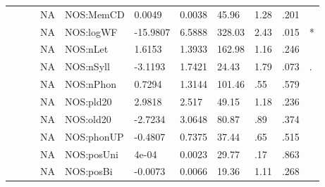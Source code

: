\begin{table}[ht]
\begin{tabular}{lllllllllll}
   &  &  & NA & NOS:MemCD & 0.0049 & 0.0038 & 45.96 & 1.28 & .201 &   \\ 
   &  &  & NA & NOS:logWF & -15.9807 & 6.5888 & 328.03 & 2.43 & .015 & * \\ 
   &  &  & NA & NOS:nLet & 1.6153 & 1.3933 & 162.98 & 1.16 & .246 &   \\ 
   &  &  & NA & NOS:nSyll & -3.1193 & 1.7421 & 24.43 & 1.79 & .073 & . \\ 
   &  &  & NA & NOS:nPhon & 0.7294 & 1.3144 & 101.46 & .55 & .579 &   \\ 
   &  &  & NA & NOS:pld20 & 2.9818 & 2.517 & 49.15 & 1.18 & .236 &   \\ 
   &  &  & NA & NOS:old20 & -2.7234 & 3.0648 & 80.87 & .89 & .374 &   \\ 
   &  &  & NA & NOS:phonUP & -0.4807 & 0.7375 & 37.44 & .65 & .515 &   \\ 
   &  &  & NA & NOS:posUni & 4e-04 & 0.0023 & 29.77 & .17 & .863 &   \\ 
   &  &  & NA & NOS:posBi & -0.0073 & 0.0066 & 19.36 & 1.11 & .268 &   \\ 
   \hline
\end{tabular}
\endgroup
\end{table}
